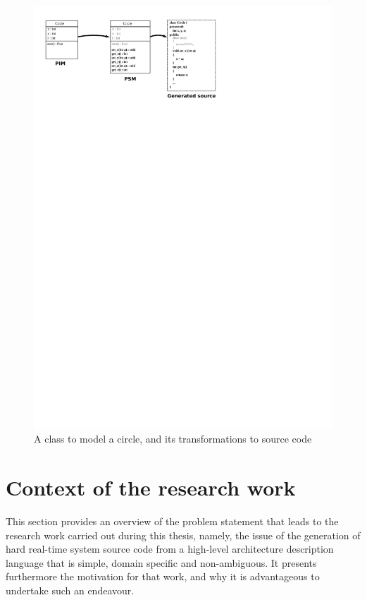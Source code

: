 \begin{figure}
\centering
\includegraphics{figs/class}
\caption{A class to model a circle, and its transformations to source
  code}
\label{fig:class}
\end{figure}

\section{Context of the research work}
This section provides an overview of the problem statement that leads
to the research work carried out during this thesis, namely, the issue
of the generation of hard real-time system source code from a
high-level architecture description language that is simple, domain
specific and non-ambiguous. It presents furthermore the motivation for
that work, and why it is advantageous to undertake such an endeavour.

